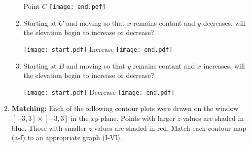 \documentclass[12pt]{article}
\begin{document}
\begin{enumerate}
\begin{enumerate}
{{Point $C$}}
\texttt{[image: end.pdf]}


\item Starting at $C$ and moving so that $x$ remains contant and $y$ decreases, will the elevation begin to increase or decrease?

\texttt{[image: start.pdf]}
{{Increase}}
\texttt{[image: end.pdf]}


\item Starting at $B$ and moving so that $y$ remains contant and $x$ increases, will the elevation begin to increase or decrease?

\texttt{[image: start.pdf]}
{{Decrease}}
\texttt{[image: end.pdf]}


\end{enumerate}

\newpage

\item {\bf Matching:} Each of the following contour plots were drawn on the window $[-3,3]\times[-3,3]$ in the $xy$-plane.  Points with larger $z$-values are shaded in blue.  Those with smaller $z$-values are shaded in red.  Match each contour map (a-f) to an appropriate graph (I-VI).


\end{enumerate}
\end{document}
